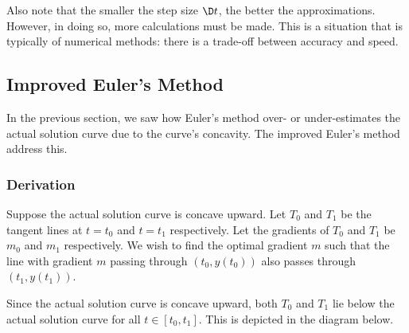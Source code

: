 Also note that the smaller the step size $\D t$, the better the approximations. However, in doing so, more calculations must be made. This is a situation that is typically of numerical methods: there is a trade-off between accuracy and speed.

\subsection{Improved Euler's Method}

In the previous section, we saw how Euler's method over- or under-estimates the actual solution curve due to the curve's concavity. The improved Euler's method address this.

\subsubsection{Derivation}

Suppose the actual solution curve is concave upward. Let $T_0$ and $T_1$ be the tangent lines at $t = t_0$ and $t = t_1$ respectively. Let the gradients of $T_0$ and $T_1$ be $m_0$ and $m_1$ respectively. We wish to find the optimal gradient $m$ such that the line with gradient $m$ passing through $(t_0, y(t_0))$ also passes through $(t_1, y(t_1))$.

Since the actual solution curve is concave upward, both $T_0$ and $T_1$ lie below the actual solution curve for all $t \in [t_0, t_1]$. This is depicted in the diagram below.

\begin{figure}[H]
    \centering
    \caption{}
\end{figure}

